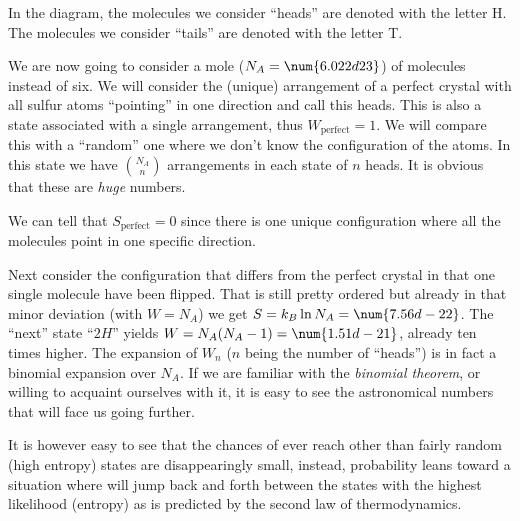 \documentclass[../mit-general-chemistry.tex]{subfiles}
\begin{document}
\begin{center}
\end{center}


In the diagram, the molecules we consider ``heads'' are denoted with
the letter H. The molecules we consider ``tails'' are denoted with the
letter T.

We are now going to consider a mole ($N_A = \num{6.022d23}$) of
molecules instead of six. We will consider the (unique) arrangement of
a perfect crystal with all sulfur atoms ``pointing'' in one direction
and call this heads. This is also a state associated with a single
arrangement, thus $W_{\text{perfect}} = 1$. We will compare this with
a ``random'' one where we don't know the configuration of the
atoms. In this state we have $\binom{N_A}{n}$ arrangements in each
state of $n$ heads. It is obvious that these are {\em huge} numbers.

We can tell that $S_{\text{perfect}} = 0$ since there is one unique
configuration where all the molecules point in one specific
direction.

Next consider the configuration that differs from the perfect crystal
in that one single molecule have been flipped. That is still pretty
ordered but already in that minor deviation (with $W = N_A$) we get $S
= k_B \ln N_A = \num{7.56d-22}$. The ``next'' state ``$2H$'' yields $W
= N_A(N_A - 1) = \num{1.51d-21}$, already ten times higher. The
expansion of $W_n$ ($n$ being the number of ``heads'') is in fact a
binomial expansion over $N_A$. If we are familiar with the {\em
  binomial theorem}, or willing to acquaint ourselves with it, it is
easy to see the astronomical numbers that will face us going
further.



It is however easy to see that the chances of ever reach other than
fairly random (high entropy) states are disappearingly small, instead,
probability leans toward a situation where will jump back and forth
between the states with the highest likelihood (entropy) as is
predicted by the second law of thermodynamics.
\end{document}
